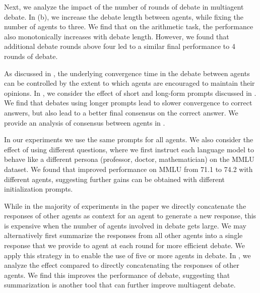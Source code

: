  Next, we analyze the impact of the number of rounds of debate in multiagent debate. In (b), we increase the debate length between agents, while fixing the number of agents to three. We find that on the arithmetic task, the performance also monotonically increases with debate length. However, we found that additional debate rounds above four led to a similar final performance to 4 rounds of debate.








 As discussed in , the underlying convergence time in the debate between agents can be controlled by the extent to which agents are encouraged to maintain their opinions. 
In , we consider the effect of short and long-form prompts discussed in . We find that debates using longer prompts lead to slower convergence to correct answers, but also lead to a better final consensus on the correct answer. We provide an analysis of consensus between agents in .



 In our experiments we use the same prompts for all agents. We also consider the effect of using different questions, where we first instruct each language model to behave like a different persona (professor, doctor, mathematician) on the MMLU dataset. We found that improved performance on MMLU from 71.1 to 74.2 with different agents, suggesting further gains can be obtained with different initialization prompts.





 While in the majority of experiments in the paper we directly concatenate the responses of other agents as context for an agent to generate a new response, this is expensive when the number of agents involved in debate gets large. We may alternatively first summarize the responses from all other agents into a single response that we provide to agent at each round for more efficient debate. We apply this strategy in  to enable the use of five or more agents in debate. In , we analyze the effect compared to directly concatenating the responses of other agents. We find this improves the performance of debate, suggesting that summarization is another tool that can further improve multiagent debate.



